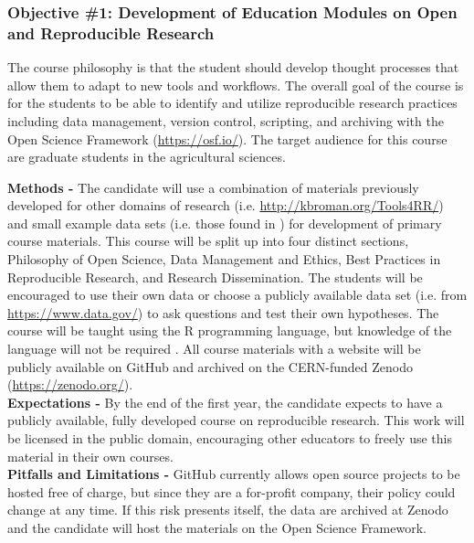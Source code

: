 \documentclass[12pt,letterpaper]{article}
\begin{document}
 


\subsubsection{Objective \#1: Development of Education Modules on Open and Reproducible Research}

The course philosophy is that the student should develop thought processes that allow them to adapt to new tools and workflows. 
The overall goal of the course is for the students to be able to identify and utilize reproducible research practices including data management, version control, scripting, and archiving with the Open Science Framework (\url{https://osf.io/}).
The target audience for this course are graduate students in the agricultural sciences.

\noindent \textbf{Methods -} 
The candidate will use a combination of materials previously developed for other domains of research (i.e. \url{http://kbroman.org/Tools4RR/}) and small example data sets (i.e. those found in \citet{sparks2008ecology}) for development of primary course materials. 
This course will be split up into four distinct sections, Philosophy of Open Science, Data Management and Ethics, Best Practices in Reproducible Research, and Research Dissemination.
The students will be encouraged to use their own data or choose a publicly available data set (i.e. from \url{https://www.data.gov/}) to ask questions and test their own hypotheses.
The course will be taught using the R programming language, but knowledge of the language will not be required \citep{R2017}.
All course materials with a website will be publicly available on GitHub and archived on the CERN-funded Zenodo (\url{https://zenodo.org/}).\\
\noindent \textbf{Expectations -}
By the end of the first year, the candidate expects to have a publicly available, fully developed course on reproducible research.
This work will be licensed in the public domain, encouraging other educators to freely use this material in their own courses.\\
\noindent \textbf{Pitfalls and Limitations -}
GitHub currently allows open source projects to be hosted free of charge, but since they are a for-profit company, their policy could change at any time. If this risk presents itself, the data are archived at Zenodo and the candidate will host the materials on the Open Science Framework.
\end{document}
